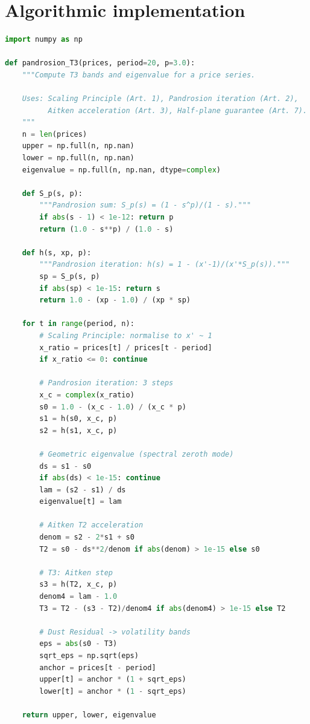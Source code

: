 \documentclass[10pt,a4paper,oneside]{book}
\theoremstyle{definition}
\theoremstyle{remark}
\begin{document}
\section{Algorithmic implementation}

\begin{lstlisting}[language=Python, caption={Pandrosion T3 indicator --- harmonically grounded implementation.}]
import numpy as np

def pandrosion_T3(prices, period=20, p=3.0):
    """Compute T3 bands and eigenvalue for a price series.
    
    Uses: Scaling Principle (Art. 1), Pandrosion iteration (Art. 2),
          Aitken acceleration (Art. 3), Half-plane guarantee (Art. 7).
    """
    n = len(prices)
    upper = np.full(n, np.nan)
    lower = np.full(n, np.nan)
    eigenvalue = np.full(n, np.nan, dtype=complex)
    
    def S_p(s, p):
        """Pandrosion sum: S_p(s) = (1 - s^p)/(1 - s)."""
        if abs(s - 1) < 1e-12: return p
        return (1.0 - s**p) / (1.0 - s)
    
    def h(s, xp, p):
        """Pandrosion iteration: h(s) = 1 - (x'-1)/(x'*S_p(s))."""
        sp = S_p(s, p)
        if abs(sp) < 1e-15: return s
        return 1.0 - (xp - 1.0) / (xp * sp)
    
    for t in range(period, n):
        # Scaling Principle: normalise to x' ~ 1
        x_ratio = prices[t] / prices[t - period]
        if x_ratio <= 0: continue
        
        # Pandrosion iteration: 3 steps
        x_c = complex(x_ratio)
        s0 = 1.0 - (x_c - 1.0) / (x_c * p)
        s1 = h(s0, x_c, p)
        s2 = h(s1, x_c, p)
        
        # Geometric eigenvalue (spectral zeroth mode)
        ds = s1 - s0
        if abs(ds) < 1e-15: continue
        lam = (s2 - s1) / ds
        eigenvalue[t] = lam
        
        # Aitken T2 acceleration
        denom = s2 - 2*s1 + s0
        T2 = s0 - ds**2/denom if abs(denom) > 1e-15 else s0
        
        # T3: Aitken step
        s3 = h(T2, x_c, p)
        denom4 = lam - 1.0
        T3 = T2 - (s3 - T2)/denom4 if abs(denom4) > 1e-15 else T2
        
        # Dust Residual -> volatility bands
        eps = abs(s0 - T3)
        sqrt_eps = np.sqrt(eps)
        anchor = prices[t - period]
        upper[t] = anchor * (1 + sqrt_eps)
        lower[t] = anchor * (1 - sqrt_eps)
    
    return upper, lower, eigenvalue
\end{lstlisting}
\end{document}
